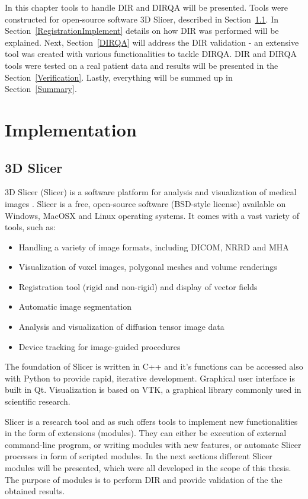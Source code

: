 \documentclass[type=dr, dr=rernat, accentcolor=tud7b,colorbacktitle, bigchapter, openright, twoside, 12pt ]{tudthesis}
\begin{document}
In this chapter tools to handle DIR and DIRQA will be presented. Tools were constructed for open-source software 3D Slicer, described in Section~\ref{Slicer}. 
In Section~\ref{RegistrationImplement} details on how DIR was performed will be explained. Next, Section~\ref{DIRQA} will address the DIR validation - an extensive tool was created with various functionalities to tackle DIRQA.
DIR and DIRQA tools were tested on a real patient data and results will be presented in the Section~\ref{Verification}. Lastly, everything will be summed up in Section~\ref{Summary}.

\section{Implementation}
\label{Implementation}

\subsection{3D Slicer}
\label{Slicer}

3D Slicer (Slicer) is a software platform for analysis and visualization of medical images \cite{Slicer, Fedorov2012}. Slicer is a free, open-source software (BSD-style license) available on Windows, MacOSX and Linux operating systems. 
It comes with a vast variety of tools, such as:

\begin{itemize}
	\item Handling a variety of image formats, including DICOM, NRRD and MHA
	\item Visualization of voxel images, polygonal meshes and volume renderings
	\item Registration tool (rigid and non-rigid) and display of vector fields
	\item Automatic image segmentation
	\item Analysis and visualization of diffusion tensor image data
	\item Device tracking for image-guided procedures
\end{itemize}

The foundation of Slicer is written in C++ and it's functions can be accessed also with Python to provide rapid, iterative development. Graphical user interface is built in Qt. Visualization is based on VTK, a graphical library commonly
used in scientific research.

Slicer is a research tool and as such offers tools to implement new functionalities in the form of extensions (modules). They can either be execution of external command-line program, or writing modules with new features,
or automate Slicer processes in form of scripted modules. In the next sections different Slicer modules will be presented, which were all developed in the scope of this thesis. 
The purpose of modules is to perform DIR and provide validation of the the obtained results.
\end{document}
